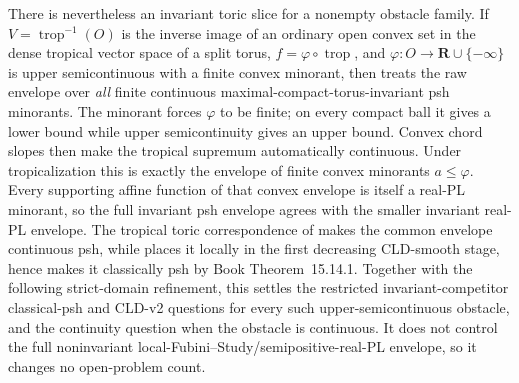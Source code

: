 \documentclass[11pt,a4paper]{article}
\theoremstyle{definition}
\theoremstyle{remark}
\begin{document}
There is nevertheless an invariant toric slice for a nonempty
obstacle family.  If \(V=\operatorname{trop}^{-1}(O)\) is the inverse image
of an ordinary open convex set in the dense tropical vector space of a split
torus, \(f=\varphi\circ\operatorname{trop}\), and
\(\varphi:O\to\mathbf R\cup\{-\infty\}\) is upper semicontinuous with a
finite convex minorant, then
 treats the raw envelope
over \emph{all} finite continuous maximal-compact-torus-invariant psh
minorants.  The minorant forces \(\varphi\) to be finite; on every compact
ball it gives a lower bound while upper semicontinuity gives an upper bound.
Convex chord slopes then make the tropical supremum automatically continuous.
Under tropicalization this is exactly the envelope of finite convex minorants
\(a\leq\varphi\).  Every supporting affine function of that convex envelope
is itself a real-PL minorant, so the full invariant psh envelope agrees with
the smaller invariant real-PL envelope.  The tropical toric correspondence of
\cite[Theorem~5.3.11]{BGJKK25} makes the common envelope continuous psh, while
 places it locally
in the first decreasing CLD-smooth stage, hence makes it classically psh by
Book Theorem~15.14.1.  Together with the following strict-domain
refinement, this settles the restricted invariant-competitor
classical-psh and CLD-v2 questions for every such upper-semicontinuous
obstacle, and the continuity question when the obstacle is continuous.  It
does not control the full noninvariant local-Fubini--Study/semipositive-real-PL
envelope, so it changes no open-problem count.
\end{document}
